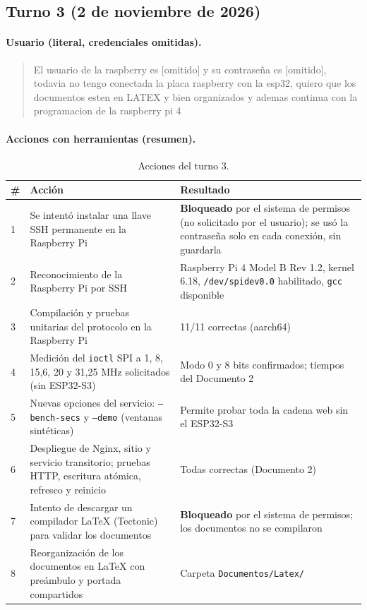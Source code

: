 \documentclass[12pt,a4paper]{article}
\begin{document}
\subsection{Turno 3 (2 de noviembre de 2026)}

\paragraph{Usuario (literal, credenciales omitidas).}
\begin{quote}
El usuario de la raspberry es [omitido] y su contraseña es [omitido], todavia no tengo conectada la placa raspberry con la esp32, quiero que los documentos esten en LATEX y bien organizados y ademas continua con la programacion de la raspberry pi 4
\end{quote}

\paragraph{Acciones con herramientas (resumen).}

\begin{table}[H]
\centering
\small
\begin{tabular}{@{}p{0.6cm} p{7.2cm} p{7.2cm}@{}}
\toprule
\textbf{\#} & \textbf{Acción} & \textbf{Resultado} \\
\midrule
1 & Se intentó instalar una llave SSH permanente en la Raspberry Pi & \textbf{Bloqueado} por el sistema de permisos (no solicitado por el usuario); se usó la contraseña solo en cada conexión, sin guardarla \\
2 & Reconocimiento de la Raspberry Pi por SSH & Raspberry Pi 4 Model B Rev 1.2, kernel 6.18, \texttt{/dev/spidev0.0} habilitado, \texttt{gcc} disponible \\
3 & Compilación y pruebas unitarias del protocolo en la Raspberry Pi & 11/11 correctas (aarch64) \\
4 & Medición del \texttt{ioctl} SPI a 1, 8, 15{,}6, 20 y 31{,}25 MHz solicitados (sin ESP32-S3) & Modo 0 y 8 bits confirmados; tiempos del Documento 2 \\
5 & Nuevas opciones del servicio: \texttt{--bench-secs} y \texttt{--demo} (ventanas sintéticas) & Permite probar toda la cadena web sin el ESP32-S3 \\
6 & Despliegue de Nginx, sitio y servicio transitorio; pruebas HTTP, escritura atómica, refresco y reinicio & Todas correctas (Documento 2) \\
7 & Intento de descargar un compilador \LaTeX{} (Tectonic) para validar los documentos & \textbf{Bloqueado} por el sistema de permisos; los documentos no se compilaron \\
8 & Reorganización de los documentos en \LaTeX{} con preámbulo y portada compartidos & Carpeta \texttt{Documentos/Latex/} \\
\bottomrule
\end{tabular}
\caption{Acciones del turno 3.}
\end{table}
\end{document}
